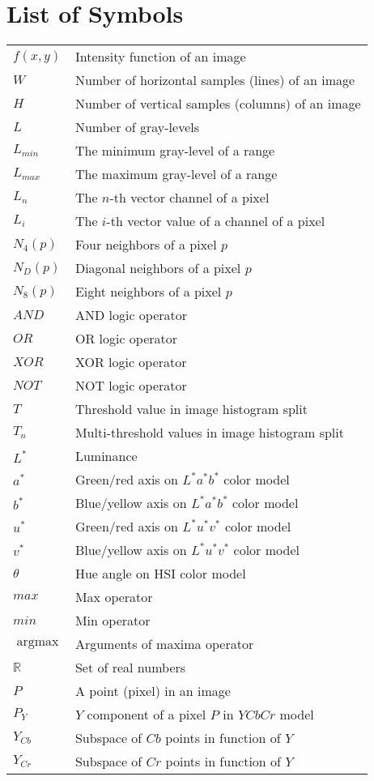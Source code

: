 \documentclass[12pt,twoside,a4paper]{book}
\theoremstyle{plain}
\theoremstyle{definition}
\DeclareMathOperator*{\argmax}{argmax}
\begin{document}
\chapter{List of Symbols}
\begin{tabular}{ll}
    $f(x, y)$   & Intensity function of an image \\
    $W$         & Number of horizontal samples (lines) of an image \\
    $H$         & Number of vertical samples (columns) of an image \\
    $L$         & Number of gray-levels \\
    $L_{min}$   & The minimum gray-level of a range \\
    $L_{max}$   & The maximum gray-level of a range \\
    $L_n$       & The $n$-th vector channel of a pixel \\
    $L_i$       & The $i$-th vector value of a channel of a pixel \\
    $N_4(p)$    & Four neighbors of a pixel $p$ \\
    $N_D(p)$    & Diagonal neighbors of a pixel $p$ \\
    $N_8(p)$    & Eight neighbors of a pixel $p$ \\
    $AND$       & AND logic operator \\
    $OR$        & OR logic operator \\
    $XOR$       & XOR logic operator \\
    $NOT$       & NOT logic operator \\
    $T$         & Threshold value in image histogram split \\
    $T_n$       & Multi-threshold values in image histogram split \\
    $L^*$       & Luminance \\
    $a^*$       & Green/red axis on $L^*a^*b^*$ color model \\
    $b^*$       & Blue/yellow axis on $L^*a^*b^*$ color model \\
    $u^*$       & Green/red axis on $L^*u^*v^*$ color model \\
    $v^*$       & Blue/yellow axis on $L^*u^*v^*$ color model \\
    $\theta$    & Hue angle on HSI color model \\
    $max$       & Max operator \\
    $min$       & Min operator \\
    $\argmax$   & Arguments of maxima operator \\
    $\mathbb{R}$& Set of real numbers \\
    $P$         & A point (pixel) in an image \\
    $P_Y$       & $Y$ component of a pixel $P$ in $YCbCr$ model \\
    $Y_{Cb}$    & Subspace of $Cb$ points in function of $Y$ \\
    $Y_{Cr}$    & Subspace of $Cr$ points in function of $Y$ \\
\end{tabular}
\end{document}
